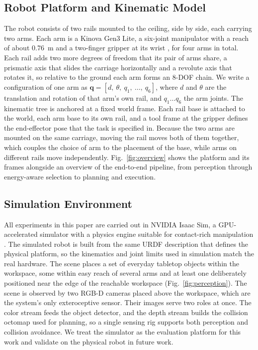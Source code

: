 \documentclass[conference]{IEEEtran}
\begin{document}
\subsection{Robot Platform and Kinematic Model}

The robot consists of two rails mounted to the ceiling, side by side, each carrying
two arms. Each arm is a Kinova Gen3 Lite, a six-joint manipulator with a reach of
about 0.76~m and a two-finger gripper at its wrist \cite{Kinova}, for four arms in
total. Each rail adds two more degrees of freedom that its pair of arms share, a
prismatic axis that slides the carriage horizontally and a revolute axis that rotates
it, so relative to the ground each arm forms an 8-DOF chain. We write a configuration
of one arm as $\mathbf{q} = [d,\ \theta,\ q_1,\ \ldots,\ q_6]$, where $d$ and $\theta$
are the translation and rotation of that arm's own rail, and $q_1 \ldots q_6$ the arm
joints. The kinematic tree is anchored at a fixed world frame. Each rail base is
attached to the world, each arm base to its own rail, and a tool frame at the gripper
defines the end-effector pose that the task is specified in. Because the two arms are
mounted on the same carriage, moving the rail moves both of them together, which
couples the choice of arm to the placement of the base, while arms on different rails
move independently. Fig.~\ref{fig:overview} shows the platform and its frames
alongside an overview of the end-to-end pipeline, from perception through
energy-aware selection to planning and execution.

\subsection{Simulation Environment}

All experiments in this paper are carried out in NVIDIA Isaac Sim, a GPU-accelerated
simulator with a physics engine suitable for contact-rich manipulation
\cite{IsaacSim2026,Mittal2023}. The simulated robot is built from the same URDF
description that defines the physical platform, so the kinematics and joint limits
used in simulation match the real hardware. The scene places a set of everyday
tabletop objects within the workspace, some within easy reach of several arms and at
least one deliberately positioned near the edge of the reachable workspace
(Fig.~\ref{fig:perception}). The scene is observed by two RGB-D cameras placed above the
workspace, which are the system's only exteroceptive sensor. Their images serve two
roles at once. The color stream feeds the object detector, and the depth stream builds
the collision octomap used for planning, so a single sensing rig supports both
perception and collision avoidance. We treat the simulator as the evaluation platform
for this work and validate on the physical robot in future work.
\end{document}
